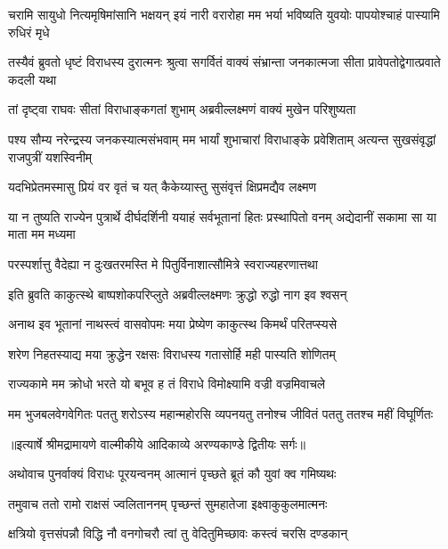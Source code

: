 \threelineshloka
{चरामि सायुधो नित्यमृषिमांसानि भक्षयन्}
{इयं नारी वरारोहा मम भर्या भविष्यति}
{युवयोः पापयोश्चाहं पास्यामि रुधिरं मृधे} %

\threelineshloka
{तस्यैवं ब्रुवतो धृष्टं विराधस्य दुरात्मनः}
{श्रुत्वा सगर्वितं वाक्यं संभ्रान्ता जनकात्मजा}
{सीता प्रावेपतोद्वेगात्प्रवाते कदली यथा} %

\twolineshloka
{तां दृष्ट्वा राघवः सीतां विराधाङ्कगतां शुभाम्}
{अब्रवील्लक्ष्मणं वाक्यं मुखेन परिशुष्यता} %

\threelineshloka
{पश्य सौम्य नरेन्द्रस्य जनकस्यात्मसंभवाम्}
{मम भार्यां शुभाचारां विराधाङ्के प्रवेशिताम्}
{अत्यन्त सुखसंवृद्धां राजपुत्रीं यशस्विनीम्} %

\twolineshloka
{यदभिप्रेतमस्मासु प्रियं वर वृतं च यत्}
{कैकेय्यास्तु सुसंवृत्तं क्षिप्रमद्यैव लक्ष्मण} %

\threelineshloka
{या न तुष्यति राज्येन पुत्रार्थे दीर्घदर्शिनी}
{ययाहं सर्वभूतानां हितः प्रस्थापितो वनम्}
{अद्येदानीं सकामा सा या माता मम मध्यमा} %

\twolineshloka
{परस्पर्शात्तु वैदेह्या न दुःखतरमस्ति मे}
{पितुर्विनाशात्सौमित्रे स्वराज्यहरणात्तथा} %

\twolineshloka
{इति ब्रुवति काकुत्स्थे बाष्पशोकपरिप्लुते}
{अब्रवील्लक्ष्मणः क्रुद्धो रुद्धो नाग इव श्वसन्} %

\twolineshloka
{अनाथ इव भूतानां नाथस्त्वं वासवोपमः}
{मया प्रेष्येण काकुत्स्थ किमर्थं परितप्स्यसे} %

\twolineshloka
{शरेण निहतस्याद्य मया क्रुद्धेन रक्षसः}
{विराधस्य गतासोर्हि मही पास्यति शोणितम्} %

\twolineshloka
{राज्यकामे मम क्रोधो भरते यो बभूव ह}
{तं विराधे विमोक्ष्यामि वज्री वज्रमिवाचले} %

\fourlineindentedshloka
{मम भुजबलवेगवेगितः}
{ पततु शरोऽस्य महान्महोरसि}
{व्यपनयतु तनोश्च जीवितं}
{ पततु ततश्च महीं विघूर्णितः} %


{॥इत्यार्षे श्रीमद्रामायणे वाल्मीकीये आदिकाव्ये अरण्यकाण्डे द्वितीयः सर्गः॥}


\twolineshloka
{अथोवाच पुनर्वाक्यं विराधः पूरयन्वनम्}
{आत्मानं पृच्छते ब्रूतं कौ युवां क्व गमिष्यथः} %

\twolineshloka
{तमुवाच ततो रामो राक्षसं ज्वलिताननम्}
{पृच्छन्तं सुमहातेजा इक्ष्वाकुकुलमात्मनः} %

\twolineshloka
{क्षत्रियो वृत्तसंपन्नौ विद्धि नौ वनगोचरौ}
{त्वां तु वेदितुमिच्छावः कस्त्वं चरसि दण्डकान्} %

